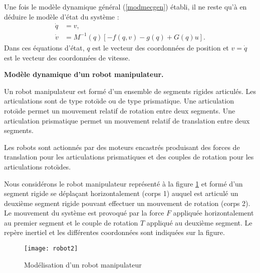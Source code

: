 \noindent Une fois le modèle dynamique général (\ref{modmecgen}) établi, il ne reste 
qu'à en déduire le modèle d'état du système :
\begin{equation*} \begin{split}
\dot{q} &= v, \\ 
\dot{v} &= M^{-1}(q)[-f(q,v) - g(q) + G(q)u].
\end{split} \end{equation*}
Dans ces équations d'état, $q$ est le vecteur des coordonnées de position et 
$v=\dot{q}$ est le vecteur des coordonnées de vitesse.

\begin{exemple} {\bf Modèle dynamique d'un robot manipulateur.}

Un robot manipulateur est formé d'un ensemble de segments rigides 
articulés.  Les articulations sont de type roto\"\i de ou de type
prismatique.  Une articulation roto\"\i de permet un mouvement
relatif de rotation entre deux segments.  Une articulation
prismatique permet un mouvement relatif de translation entre deux
segments.

Les robots sont actionnés par des moteurs encastrés produisant
des forces de translation pour les articulations prismatiques et des
couples de rotation pour les articulations roto\"\i des.

Nous considérons le robot manipulateur représenté à la figure 
\ref{Fig:robot} et formé d'un segment rigide se déplaçant horizontalement
(corps 1) auquel est articulé un deuxième segment rigide pouvant effectuer un mouvement
de rotation (corps 2). Le mouvement du système est provoqué par la force $F$ appliquée 
horizontalement au premier segment et le couple de rotation $T$ appliqué au deuxième
segment. Le repère inertiel et les  différentes coordonnées sont indiquées sur la figure.

\begin{figure}[ht]
\begin{center}
\texttt{[image: robot2]}
\caption{Modélisation d'un robot manipulateur}
\label{Fig:robot}
\end{center}
\end{figure}


\end{exemple}
